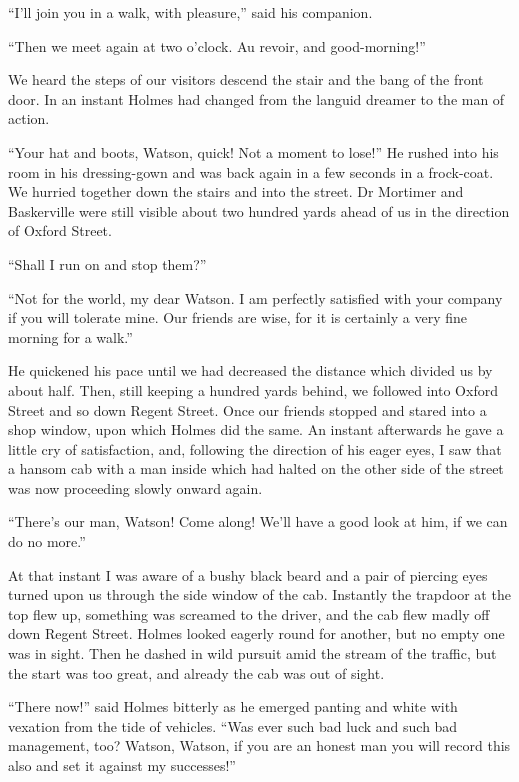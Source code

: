 \documentclass[paper=5.5in:8.5in,BCOR=7mm,twoside,DIV=calc,12pt,usegeometry,openany,chapterprefix,endperiod,headings=big]{scrbook} %
\begin{document}
\enquote{I'll join you in a walk, with pleasure,} said his companion.

\enquote{Then we meet again at two o'clock. Au revoir, and good-morning!}

We heard the steps of our visitors descend the stair and the bang of the front door. In an instant Holmes had changed from the languid dreamer to the man of action.

\enquote{Your hat and boots, Watson, quick! Not a moment to lose!} He rushed into his room in his dressing-gown and was back again in a few seconds in a frock-coat. We hurried together down the stairs and into the street. Dr Mortimer and Baskerville were still visible about two hundred yards ahead of us in the direction of Oxford Street.

\enquote{Shall I run on and stop them?}

\enquote{Not for the world, my dear Watson. I am perfectly satisfied with your company if you will tolerate mine. Our friends are wise, for it is certainly a very fine morning for a walk.}

He quickened his pace until we had decreased the distance which divided us by about half. Then, still keeping a hundred yards behind, we followed into Oxford Street and so down Regent Street. Once our friends stopped and stared into a shop window, upon which Holmes did the same. An instant afterwards he gave a little cry of satisfaction, and, following the direction of his eager eyes, I saw that a hansom cab with a man inside which had halted on the other side of the street was now proceeding slowly onward again.

\enquote{There's our man, Watson! Come along! We'll have a good look at him, if we can do no more.}

At that instant I was aware of a bushy black beard and a pair of piercing eyes turned upon us through the side window of the cab. Instantly the trapdoor at the top flew up, something was screamed to the driver, and the cab flew madly off down Regent Street. Holmes looked eagerly round for another, but no empty one was in sight. Then he dashed in wild pursuit amid the stream of the traffic, but the start was too great, and already the cab was out of sight.

\enquote{There now!} said Holmes bitterly as he emerged panting and white with vexation from the tide of vehicles. \enquote{Was ever such bad luck and such bad management, too? Watson, Watson, if you are an honest man you will record this also and set it against my successes!}
\end{document}
